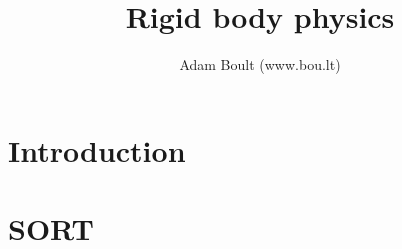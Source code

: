 \documentclass[oneside]{book}
\begin{document}
\author{Adam Boult (www.bou.lt)}
\title{Rigid body physics}
\maketitle

\setcounter{tocdepth}{0}
\tableofcontents



\part{Introduction}





\part{SORT}

\end{document}
